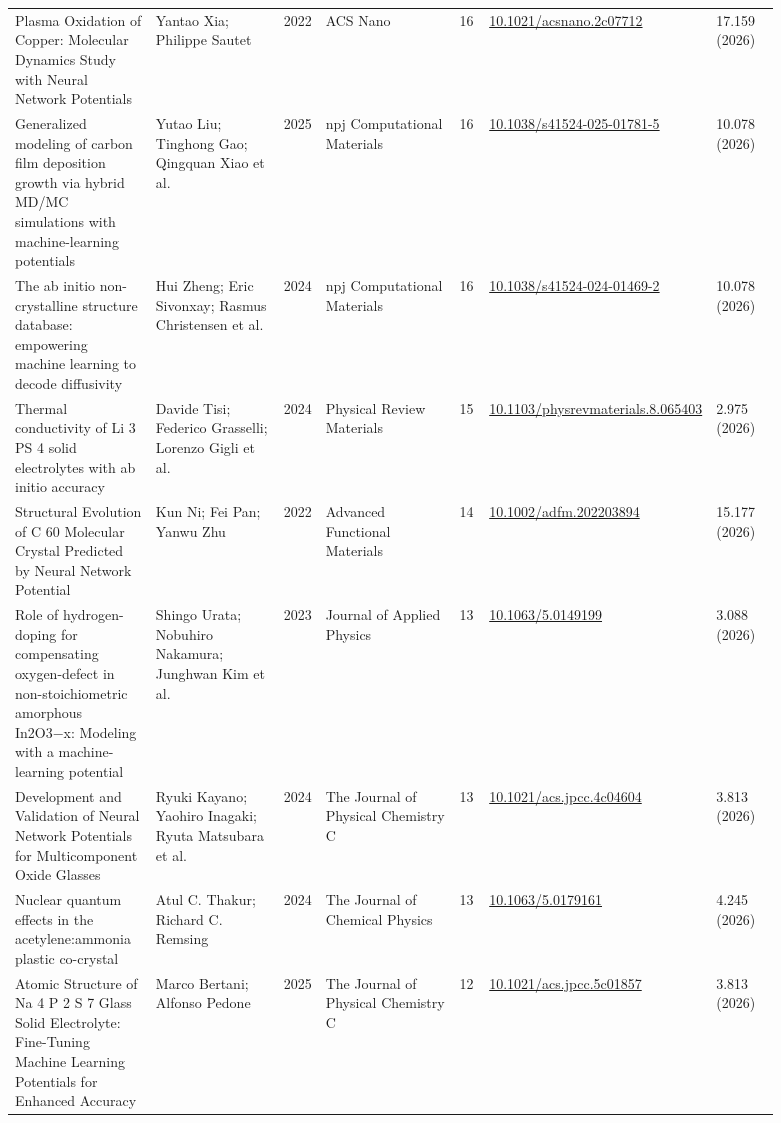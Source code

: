 \documentclass[10pt,a4paper]{article}
\begin{document}
{\begin{longtable}{p{0.192\linewidth}p{0.192\linewidth}p{0.043\linewidth}p{0.192\linewidth}p{0.043\linewidth}p{0.132\linewidth}p{0.096\linewidth}}
Plasma Oxidation of Copper: Molecular Dynamics Study with Neural Network Potentials & Yantao Xia; Philippe Sautet & 2022 & ACS Nano & 16 & \href{https://doi.org/10.1021/acsnano.2c07712}{10.1021/acsnano.2c07712} & 17.159 (2026) \\
Generalized modeling of carbon film deposition growth via hybrid MD/MC simulations with machine-learning potentials & Yutao Liu; Tinghong Gao; Qingquan Xiao et al. & 2025 & npj Computational Materials & 16 & \href{https://doi.org/10.1038/s41524-025-01781-5}{10.1038/s41524-025-01781-5} & 10.078 (2026) \\
The ab initio non-crystalline structure database: empowering machine learning to decode diffusivity & Hui Zheng; Eric Sivonxay; Rasmus Christensen et al. & 2024 & npj Computational Materials & 16 & \href{https://doi.org/10.1038/s41524-024-01469-2}{10.1038/s41524-024-01469-2} & 10.078 (2026) \\
Thermal conductivity of Li 3 PS 4 solid electrolytes with ab initio accuracy & Davide Tisi; Federico Grasselli; Lorenzo Gigli et al. & 2024 & Physical Review Materials & 15 & \href{https://doi.org/10.1103/physrevmaterials.8.065403}{10.1103/physrevmaterials.8.065403} & 2.975 (2026) \\
Structural Evolution of C 60 Molecular Crystal Predicted by Neural Network Potential & Kun Ni; Fei Pan; Yanwu Zhu & 2022 & Advanced Functional Materials & 14 & \href{https://doi.org/10.1002/adfm.202203894}{10.1002/adfm.202203894} & 15.177 (2026) \\
Role of hydrogen-doping for compensating oxygen-defect in non-stoichiometric amorphous In2O3−x: Modeling with a machine-learning potential & Shingo Urata; Nobuhiro Nakamura; Junghwan Kim et al. & 2023 & Journal of Applied Physics & 13 & \href{https://doi.org/10.1063/5.0149199}{10.1063/5.0149199} & 3.088 (2026) \\
Development and Validation of Neural Network Potentials for Multicomponent Oxide Glasses & Ryuki Kayano; Yaohiro Inagaki; Ryuta Matsubara et al. & 2024 & The Journal of Physical Chemistry C & 13 & \href{https://doi.org/10.1021/acs.jpcc.4c04604}{10.1021/acs.jpcc.4c04604} & 3.813 (2026) \\
Nuclear quantum effects in the acetylene:ammonia plastic co-crystal & Atul C. Thakur; Richard C. Remsing & 2024 & The Journal of Chemical Physics & 13 & \href{https://doi.org/10.1063/5.0179161}{10.1063/5.0179161} & 4.245 (2026) \\
Atomic Structure of Na 4 P 2 S 7 Glass Solid Electrolyte: Fine-Tuning Machine Learning Potentials for Enhanced Accuracy & Marco Bertani; Alfonso Pedone & 2025 & The Journal of Physical Chemistry C & 12 & \href{https://doi.org/10.1021/acs.jpcc.5c01857}{10.1021/acs.jpcc.5c01857} & 3.813 (2026) \\

\end{longtable}}
\end{document}
